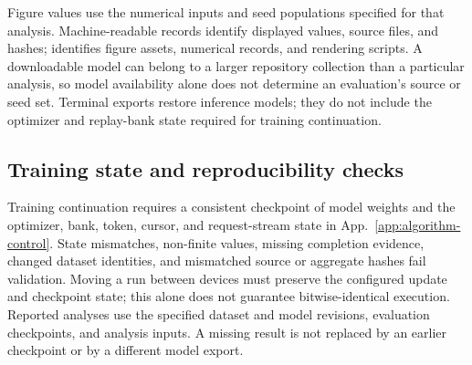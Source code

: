 \documentclass{article}
\newcommand{\1}{\mathbf 1}
\theoremstyle{remark}
\theoremstyle{definition}
\theoremstyle{plain}
\begin{document}
Figure values use the numerical inputs and seed populations
specified for that analysis. Machine-readable records identify displayed
values, source files, and hashes;
 identifies figure assets, numerical
records, and rendering scripts. A downloadable model can belong to a larger
repository collection than a particular analysis, so model availability
alone does not determine an evaluation's source or seed set. Terminal
exports restore inference models; they do not include the optimizer and
replay-bank state required for training continuation.

\subsection{Training state and reproducibility checks}
\label{app:repro-recovery}

Training continuation requires a consistent checkpoint of model weights
and the optimizer, bank, token, cursor, and request-stream state in
App.~\ref{app:algorithm-control}. State mismatches, non-finite values,
missing completion evidence, changed dataset identities, and mismatched
source or aggregate hashes fail validation. Moving a run between devices
must preserve the configured update and checkpoint state; this alone
does not guarantee bitwise-identical execution. Reported analyses use the
specified dataset and model revisions, evaluation checkpoints, and
analysis inputs. A missing result is not replaced by an earlier checkpoint
or by a different model export.
\end{document}
